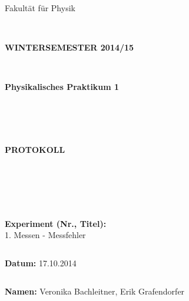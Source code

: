 \documentclass{article}
\begin{document}
\thispagestyle{empty}
			\begin{center}
			\Large{Fakultät für Physik}\\
			\end{center}
\begin{verbatim}


\end{verbatim}
			\begin{center}
			\textbf{\LARGE WINTERSEMESTER 2014/15}
			\end{center}
\begin{verbatim}


\end{verbatim}
			\begin{center}
			\textbf{\LARGE{Physikalisches Praktikum 1}}
			\end{center}
\begin{verbatim}




\end{verbatim}

			\begin{center}
			\textbf{\LARGE{PROTOKOLL}}
			\end{center}
			
\begin{verbatim}





\end{verbatim}

			\begin{flushleft}
			\textbf{\Large{Experiment (Nr., Titel):}}\\
			\LARGE{1. Messen - Messfehler}	
			\end{flushleft}

\begin{verbatim}

\end{verbatim}	
			\begin{flushleft}
			\textbf{\Large{Datum:}} \Large{17.10.2014}
			\end{flushleft}
			
\begin{verbatim}
\end{verbatim}
		\begin{flushleft}
			\textbf{\Large{Namen:}} \Large{Veronika Bachleitner, Erik Grafendorfer}
			\end{flushleft}
\end{document}

